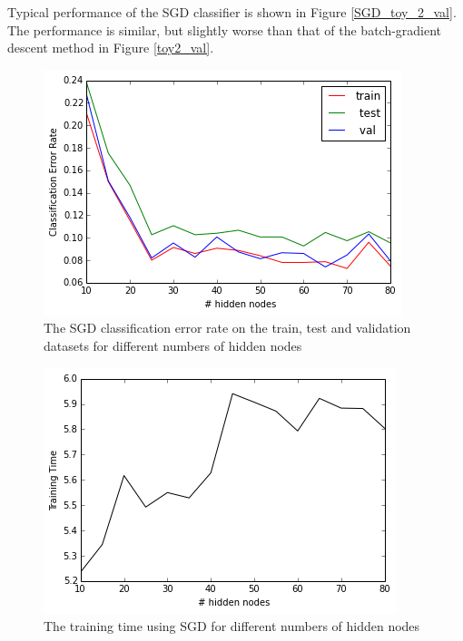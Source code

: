 \documentclass[10pt]{article}
\begin{document}
Typical performance of the SGD classifier is shown in Figure \ref{SGD_toy_2_val}. The performance is similar, but slightly worse than that of the batch-gradient descent method in Figure \ref{toy2_val}.
%
\begin{figure}
\centering
\includegraphics[scale=0.5]{SGD_toy_data_2_CER.png}
\caption{The SGD classification error rate on the train, test and validation datasets for different numbers of hidden nodes}
\label{SGD_toy_data_2_CER}
\end{figure}
%
\begin{figure}
\centering
\includegraphics[scale=0.5]{SGD_toy_data_2_training_time.png}
\caption{The training time using SGD for different numbers of hidden nodes}
\label{SGD_toy_data_2_training_time}
\end{figure}
\end{document}
